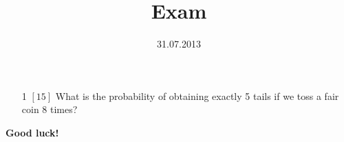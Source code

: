 \documentclass{article}
\title{Exam}
\date{31.07.2013}
\begin{document}
\maketitle{}
\begin{itemize}
\item[1] {\small $\left[15\right]$ }
What is the probability of obtaining exactly 5 tails if we toss a fair coin 8 times?
\vspace{\baselineskip} \vspace{\baselineskip} \vspace{\baselineskip}\end{itemize}
{\bf Good luck! }\newpage
\end{document}
